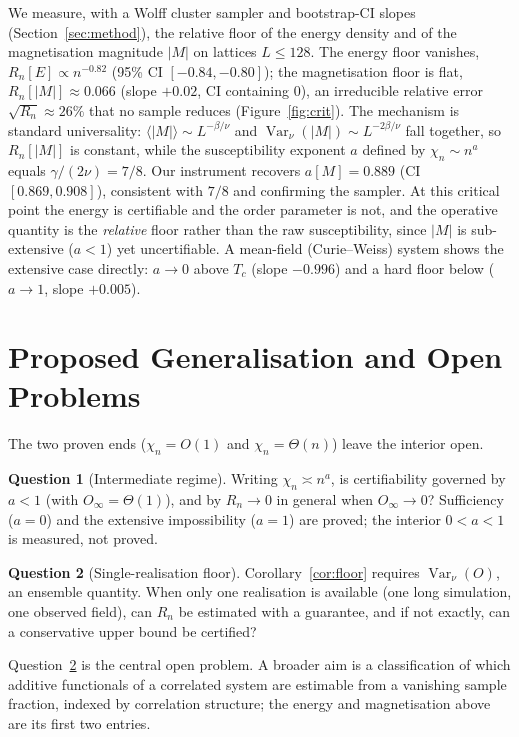 \documentclass[11pt]{article}
\theoremstyle{definition}
\newtheorem{question}{Question}
\newcommand{\Var}{\operatorname{Var}}
\newcommand{\Rn}{R_n}
\begin{document}
We measure, with a Wolff cluster sampler \citep{wolff} and bootstrap-CI slopes (Section~\ref{sec:method}), the relative floor of the energy density and of the magnetisation magnitude $|M|$ on lattices $L\le128$. The energy floor vanishes, $\Rn[E]\propto n^{-0.82}$ (95\% CI $[-0.84,-0.80]$); the magnetisation floor is flat, $\Rn[|M|]\approx0.066$ (slope $+0.02$, CI containing $0$), an irreducible relative error $\sqrt{\Rn}\approx26\%$ that no sample reduces (Figure~\ref{fig:crit}). The mechanism is standard universality: $\langle|M|\rangle\sim L^{-\beta/\nu}$ and $\Var_\nu(|M|)\sim L^{-2\beta/\nu}$ fall together, so $\Rn[|M|]$ is constant, while the susceptibility exponent $a$ defined by $\chi_n\sim n^a$ equals $\gamma/(2\nu)=7/8$. Our instrument recovers $a[M]=0.889$ (CI $[0.869,0.908]$), consistent with $7/8$ and confirming the sampler. At this critical point the energy is certifiable and the order parameter is not, and the operative quantity is the \emph{relative} floor rather than the raw susceptibility, since $|M|$ is sub-extensive ($a<1$) yet uncertifiable. A mean-field (Curie--Weiss) system shows the extensive case directly: $a\to0$ above $T_c$ (slope $-0.996$) and a hard floor below ($a\to1$, slope $+0.005$).

\section{Proposed Generalisation and Open Problems}
The two proven ends ($\chi_n=O(1)$ and $\chi_n=\Theta(n)$) leave the interior open.
\begin{question}[Intermediate regime]
Writing $\chi_n\asymp n^{a}$, is certifiability governed by $a<1$ (with $O_\infty=\Theta(1)$), and by $\Rn\to0$ in general when $O_\infty\to0$? Sufficiency ($a=0$) and the extensive impossibility ($a=1$) are proved; the interior $0<a<1$ is measured, not proved.
\end{question}
\begin{question}[Single-realisation floor]\label{q:single}
Corollary~\ref{cor:floor} requires $\Var_\nu(O)$, an ensemble quantity. When only one realisation is available (one long simulation, one observed field), can $\Rn$ be estimated with a guarantee, and if not exactly, can a conservative upper bound be certified?
\end{question}
Question~\ref{q:single} is the central open problem. A broader aim is a classification of which additive functionals of a correlated system are estimable from a vanishing sample fraction, indexed by correlation structure; the energy and magnetisation above are its first two entries.
\end{document}
